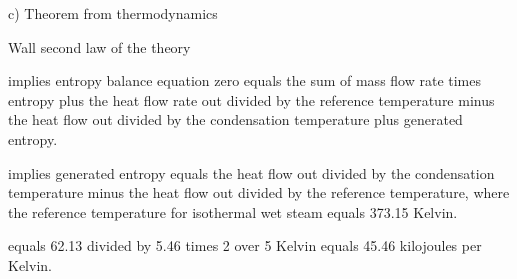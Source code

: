 c) Theorem from thermodynamics

Wall second law of the theory

implies entropy balance equation zero equals the sum of mass flow rate times entropy plus the heat flow rate out divided by the reference temperature minus the heat flow out divided by the condensation temperature plus generated entropy.

implies generated entropy equals the heat flow out divided by the condensation temperature minus the heat flow out divided by the reference temperature, where the reference temperature for isothermal wet steam equals 373.15 Kelvin.

equals 62.13 divided by 5.46 times 2 over 5 Kelvin equals 45.46 kilojoules per Kelvin.